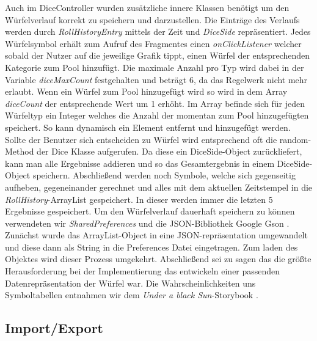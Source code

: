 Auch im DiceController wurden zusätzliche innere Klassen benötigt um den Würfelverlauf korrekt zu speichern und darzustellen. Die Einträge des Verlaufs werden durch \textit{RollHistoryEntry} mittels der Zeit und \textit{DiceSide} repräsentiert. Jedes Würfelsymbol erhält zum Aufruf des Fragmentes einen \textit{onClickListener} welcher sobald der Nutzer auf die jeweilige Grafik tippt, einen Würfel der entsprechenden Kategorie zum \grqq Pool\grqq{} hinzufügt. Die maximale Anzahl pro Typ wird dabei in der Variable \textit{diceMaxCount} festgehalten und beträgt 6, da das Regelwerk nicht mehr erlaubt. Wenn ein Würfel zum Pool hinzugefügt wird so wird in dem Array \textit{diceCount} der entsprechende Wert um 1 erhöht. Im Array befinde sich für jeden Würfeltyp ein Integer welches die Anzahl der momentan zum Pool hinzugefügten speichert. So kann dynamisch ein Element entfernt und hinzugefügt werden. Sollte der Benutzer sich entscheiden zu Würfel wird entsprechend oft die random-Method der Dice Klasse aufgerufen. Da diese ein DiceSide-Object zurückliefert, kann man alle Ergebnisse addieren und so das Gesamtergebnis in einem DiceSide-Object speichern. Abschließend werden noch Symbole, welche sich gegenseitig aufheben, gegeneinander gerechnet und alles mit dem aktuellen Zeitstempel in die \textit{RollHistory}-ArrayList gespeichert. In dieser werden immer die letzten 5 Ergebnisse gespeichert. Um den Würfelverlauf dauerhaft speichern zu können verwendeten wir \textit{SharedPreferences} und die JSON-Bibliothek Google Gson \cite{gson}. Zunächst wurde das ArrayList-Object in eine JSON-repräsentation umgewandelt und diese dann als String in die Preferences Datei eingetragen. Zum laden des Objektes wird dieser Prozess umgekehrt. Abschließend sei zu sagen das die größte Herausforderung bei der Implementierung das entwickeln einer passenden Datenrepräsentation der Würfel war. Die Wahrscheinlichkeiten uns Symboltabellen entnahmen wir dem \textit{Under a black Sun}-Storybook \cite{adventurebook}.

\subsection{Import/Export}

